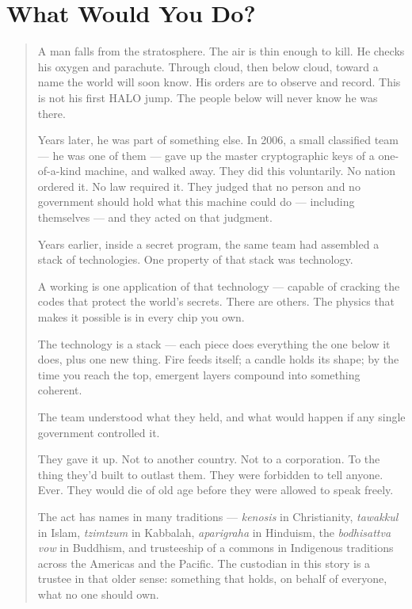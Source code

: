 
\chapter*{What Would You Do?}
\label{hook:what-would-you-do}

\begin{quote}
\large

A man falls from the stratosphere. The air is thin enough to kill. He checks his oxygen and parachute. Through cloud, then below cloud, toward a name the world will soon know. His orders are to observe and record. This is not his first HALO jump. The people below will never know he was there.

Years later, he was part of something else. In 2006, a small classified team --- he was one of them --- gave up the master cryptographic keys of a one-of-a-kind machine, and walked away. They did this voluntarily. No nation ordered it. No law required it. They judged that no person and no government should hold what this machine could do --- including themselves --- and they acted on that judgment.

Years earlier, inside a secret program, the same team had assembled a stack of technologies. One  property of that stack was  technology.

A working  is one application of that technology --- capable of cracking the codes that protect the world's secrets. There are others. The physics that makes it possible is in every chip you own.

The technology is a stack --- each piece does everything the one below it does, plus one new thing. Fire feeds itself; a candle holds its shape; by the time you reach the top, emergent layers compound into something coherent.

The team understood what they held, and what would happen if any single government controlled it.

They gave it up. Not to another country. Not to a corporation. To the thing they'd built to outlast them. They were forbidden to tell anyone. Ever. They would die of old age before they were allowed to speak freely.

The act has names in many traditions --- \textit{kenosis} in Christianity, \textit{tawakkul} in Islam, \textit{tzimtzum} in Kabbalah, \textit{aparigraha} in Hinduism, the \textit{bodhisattva vow} in Buddhism, and trusteeship of a commons in Indigenous traditions across the Americas and the Pacific. The custodian in this story is a trustee in that older sense: something that holds, on behalf of everyone, what no one should own.


\end{quote}
